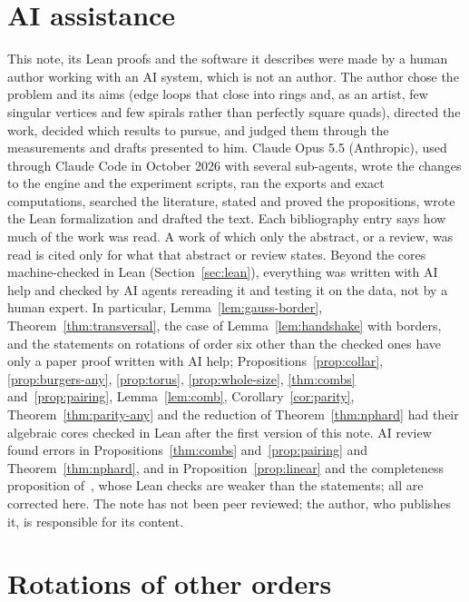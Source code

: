 \documentclass[11pt,a4paper]{article}
\begin{document}
\section*{AI assistance}
This note, its Lean proofs and the software it describes were made by a human
author working with an AI system, which is not an author. The author chose the
problem and its aims (edge loops that close into rings and, as an artist, few
singular vertices and few spirals rather than perfectly square quads),
directed the work, decided which results to pursue, and judged them through
the measurements and drafts presented to him. Claude Opus 5.5 (Anthropic),
used through Claude Code in October 2026 with several sub-agents, wrote the
changes to the engine and the experiment scripts, ran the exports and exact
computations, searched the literature, stated and proved the propositions,
wrote the Lean formalization and drafted the text. Each bibliography entry says how much of the work was read. A work of which only the abstract, or a review, was read is cited only for what that abstract or review states.
Beyond the cores machine-checked in Lean (Section~\ref{sec:lean}), everything
was written with AI help and checked by AI agents rereading it and testing it
on the data, not by a human expert. In particular, Lemma~\ref{lem:gauss-border},
Theorem~\ref{thm:transversal}, the
case of Lemma~\ref{lem:handshake} with borders, and the statements on
rotations of order six other than the checked ones have only a paper proof
written with AI help; Propositions~\ref{prop:collar}, \ref{prop:burgers-any},
\ref{prop:torus}, \ref{prop:whole-size}, \ref{thm:combs} and~\ref{prop:pairing}, Lemma~\ref{lem:comb},
Corollary~\ref{cor:parity}, Theorem~\ref{thm:parity-any} and the reduction of
Theorem~\ref{thm:nphard} had their algebraic cores checked in Lean after the
first version of this note. AI review found errors in Propositions~\ref{thm:combs}
and~\ref{prop:pairing} and Theorem~\ref{thm:nphard}, and in
Proposition~\ref{prop:linear} and the completeness proposition
of~\cite{gardent2026loops}, whose Lean checks are weaker than the statements;
all are corrected here. The note has not been peer reviewed; the author, who
publishes it, is responsible for its content.




\appendix

\section{Rotations of other orders}\label{app:orders}
\end{document}
